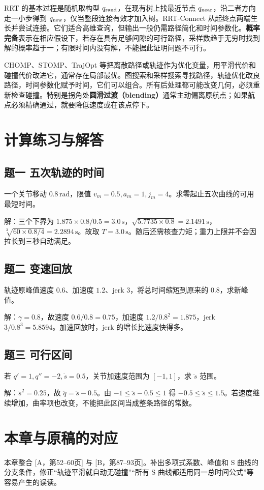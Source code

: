 RRT 的基本过程是随机取构型 $q_{\rm rand}$，在现有树上找最近节点 $q_{\rm near}$，沿二者方向走一小步得到 $q_{\rm new}$，仅当整段连接有效才加入树。RRT-Connect 从起终点两端生长并尝试连接。它们适合高维查询，但输出一般仍需路径简化和时间参数化。\textbf{概率完备}表示在相应假设下，若存在具有足够间隙的可行路径，采样数趋于无穷时找到解的概率趋于一；有限时间内没有解，不能据此证明问题不可行。\cite{lavalle}

CHOMP、STOMP、TrajOpt 等把离散路径或轨迹作为优化变量，用平滑代价和碰撞代价改进它，通常存在局部最优。图搜索和采样搜索寻找路径，轨迹优化改良路径，时间参数化赋予时间，它们可以组合。所有后处理都可能改变几何，必须重新检查碰撞。特别是拐角处\textbf{圆滑过渡（blending）}通常主动偏离原航点；如果航点必须精确通过，就要降低速度或在该点停下。

\section{计算练习与解答}

\subsection*{题一 五次轨迹的时间}
一个关节移动 $0.8\,\mathrm{rad}$，限值 $v_m=0.5,a_m=1,j_m=4$。求零起止五次曲线的可用最短时间。

解：三个下界为 $1.875\times0.8/0.5=3.0\,\mathrm{s}$，$\sqrt{5.7735\times0.8}=2.1491\,\mathrm{s}$，$\sqrt[3]{60\times0.8/4}=2.2894\,\mathrm{s}$。故取 $T=3.0\,\mathrm{s}$。随后还需核查力矩；重力上限并不会因拉长到三秒自动满足。

\subsection*{题二 变速回放}
轨迹原峰值速度 $0.6$、加速度 $1.2$、jerk $3$，将总时间缩短到原来的 $0.8$，求新峰值。

解：$\gamma=0.8$，故速度 $0.6/0.8=0.75$，加速度 $1.2/0.8^2=1.875$，jerk $3/0.8^3=5.8594$。加速回放时，jerk 的增长比速度快得多。

\subsection*{题三 可行区间}
若 $q'=1,q''=-2,\dot s=0.5$，关节加速度范围为 $[-1,1]$，求 $\ddot s$ 范围。

解：$\dot s^2=0.25$，故 $\ddot q=\ddot s-0.5$。由 $-1\le\ddot s-0.5\le1$ 得 $-0.5\le\ddot s\le1.5$。若速度继续增加，曲率项也改变，不能把此区间当成整条路径的常数。

\section*{本章与原稿的对应}
本章整合 [A，第52--60页] 与 [B，第87--93页]。补出多项式系数、峰值和 S 曲线的分支条件，修正“轨迹平滑就自动无碰撞”“所有 S 曲线都适用同一总时间公式”等容易产生的误读。
